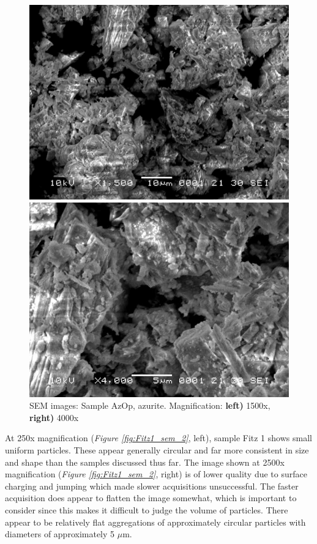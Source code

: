 \begin{figure}[H]
\centering
\begin{minipage}{.45\textwidth}
  \centering
  \includegraphics[width=\linewidth]{AzOp_x1500_2_150321}
\end{minipage}
\begin{minipage}{.45\textwidth}
  \centering
  \includegraphics[width=\linewidth]{AzOp_x4000_1_150321}
\end{minipage}
\caption[SEM images: Sample AzOp, azurite]{SEM images: Sample AzOp, azurite. Magnification: \textbf{left)} 1500x, \textbf{right)} 4000x}
\label{fig:azop_sem_3}
\end{figure}


At 250x magnification (\textit{Figure \ref{fig:Fitz1_sem_2}}, left), sample Fitz 1 shows small uniform particles. These appear generally circular and far more consistent in size and shape than the samples discussed thus far. The image shown at 2500x magnification (\textit{Figure \ref{fig:Fitz1_sem_2}}, right) is of lower quality due to surface charging and jumping which made slower acquisitions unsuccessful. The faster acquisition does appear to flatten the image somewhat, which is important to consider since this makes it difficult to judge the volume of particles. There appear to be relatively flat aggregations of approximately circular particles with diameters of approximately 5 $\mu$m.


